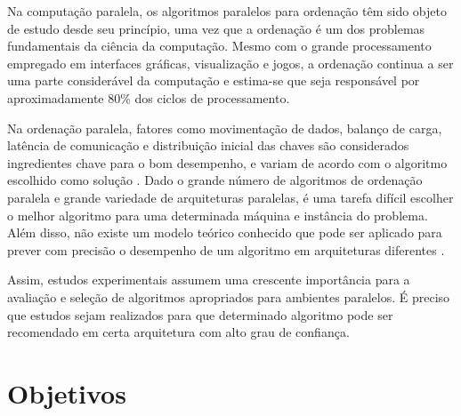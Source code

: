 
Na computação paralela, os algoritmos paralelos para ordenação têm sido objeto de estudo desde seu princípio, uma vez que a  ordenação é um dos problemas fundamentais da ciência da computação. Mesmo com o grande processamento  empregado em interfaces gráficas, visualização e jogos, a ordenação continua a ser uma parte considerável da computação e estima-se que seja responsável por aproximadamente 80\% dos ciclos de processamento.




Na ordenação paralela, fatores como movimentação de dados, balanço de carga, latência de comunicação e distribuição inicial das chaves são considerados ingredientes chave para o bom desempenho, e variam de acordo com o algoritmo escolhido como solução \cite{Kale:2010}. 
Dado o grande número de algoritmos de ordenação paralela e grande variedade de arquiteturas paralelas, é uma tarefa difícil escolher o melhor algoritmo para uma determinada máquina e instância do problema. Além disso, não existe um modelo teórico conhecido que pode ser aplicado para prever com precisão o desempenho de um algoritmo em arquiteturas diferentes \cite{Amato:1996}.

Assim, estudos experimentais assumem uma crescente importância para a avaliação e seleção de algoritmos apropriados para ambientes paralelos. É preciso que estudos sejam realizados para que determinado algoritmo pode ser recomendado em certa arquitetura com alto grau de confiança.

\section{Objetivos}

